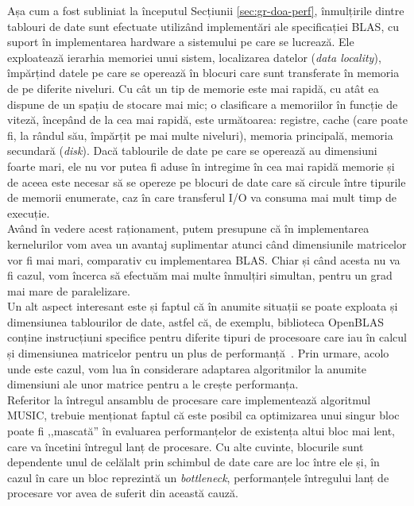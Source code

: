 Așa cum a fost subliniat la începutul Secțiunii \ref{sec:gr-doa-perf},
înmulțirile dintre tablouri de date sunt efectuate utilizând implementări ale
specificației BLAS, cu suport în implementarea hardware a sistemului pe care se lucrează.
Ele exploatează ierarhia memoriei unui sistem, localizarea datelor (\textit{data
locality}), împărțind datele pe care se operează în blocuri care sunt
transferate în memoria de pe diferite niveluri. Cu cât un tip de memorie este
mai rapidă, cu atât ea dispune de un spațiu de stocare mai mic; o clasificare a
memoriilor în funcție de viteză, începând de la cea mai rapidă, este următoarea:
registre, cache (care poate fi, la rândul său, împărțit pe mai multe niveluri),
memoria principală, memoria secundară (\textit{disk}). Dacă tablourile de date
pe care se operează au dimensiuni foarte mari, ele nu vor putea fi aduse în
intregime în cea mai rapidă memorie și de aceea este necesar să se opereze pe
blocuri de date care să circule între tipurile de memorii enumerate, caz în care
transferul I/O va consuma mai mult timp de execuție. \\

Având în vedere acest raționament, putem presupune că în implementarea
kernelurilor vom avea un avantaj suplimentar atunci când dimensiunile matricelor
vor fi mai mari, comparativ cu implementarea BLAS. Chiar și când acesta nu va fi
cazul, vom încerca să efectuăm mai multe înmulțiri simultan, pentru un grad mai
mare de paralelizare. \\

Un alt aspect interesant este și faptul că în anumite situații se poate exploata
și dimensiunea tablourilor de date, astfel că, de exemplu, biblioteca
OpenBLAS~\cite{openblas} conține instrucțiuni specifice pentru diferite tipuri de
procesoare care iau în calcul și dimensiunea matricelor pentru un plus de
performanță~\cite{openblas-repo}. Prin urmare, acolo unde este cazul, vom lua în considerare
adaptarea algoritmilor la anumite dimensiuni ale unor matrice pentru a le crește
performanța. \\

Referitor la întregul ansamblu de procesare care implementează algoritmul MUSIC,
trebuie menționat faptul că este posibil ca optimizarea unui singur bloc poate
fi ,,mascată'' în evaluarea performanțelor de existența altui bloc mai lent,
care va încetini întregul lanț de procesare. Cu alte cuvinte, blocurile sunt
dependente unul de celălalt prin schimbul de date care are loc între ele și, în
cazul în care un bloc reprezintă un \textit{bottleneck}, performanțele
întregului lanț de procesare vor avea de suferit din această cauză.




